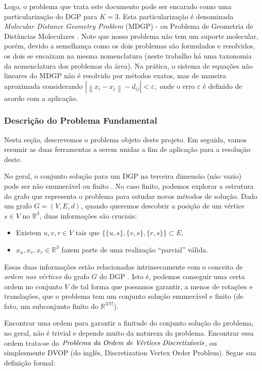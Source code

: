 \documentclass[11pt]{article}
\begin{document}
{Logo, o problema que trata este documento pode ser encarado como uma particularização do DGP para $K = 3$. Esta particularização é denominada {\emph{Molecular Distance Geometry Problem}} (MDGP) - ou Problema de Geometria de Distâncias Moleculares \cite{LavorCNMAC:14}. Note que nosso problema não tem um suporte molecular, porém, devido a semelhança como os dois problemas são formulados e resolvidos, os dois se encaixam na mesma nomenclatura \cite{Survey:12} (neste trabalho há uma taxonomia da nomenclatura dos problemas da área). Na prática, o sistema de equações não lineares do MDGP não é resolvido por métodos exatos, mas de maneira aproximada considerando $| \left\|x_{i}-x_{j}\right\| -  d_{ij} |  < \varepsilon,$ onde o  erro $\varepsilon$ é definido de acordo com a aplicação.

\subsubsection{Descrição do Problema Fundamental}
Nesta seção, descrevemos o problema objeto deste projeto. Em seguida, vamos resumir as duas ferramentas a serem unidas a fim de aplicação para a resolução deste.

No geral, o conjunto solução para um DGP na terceira dimensão (não vazio) pode ser não enumerável ou finito \cite{carlileBook31Coloquio}. No caso finito, podemos explorar a estrutura do grafo que representa o problema para estudar novos métodos de solução. Dado um grafo $G = (V, E, d)$, quando queremos descobrir a posição de um vértice $s \in V$ no $\mathbb{R}^3$, duas informações são cruciais:
\begin{itemize}
	\item Existem $u, v, r \in V$ tais que $\{\{u,s\},\{v,s\},\{r,s\}\} \subset E$,
	\item $x_u, x_v, x_r \in \mathbb{R}^3$ fazem parte de uma realização ``parcial'' válida.
\end{itemize}

Essas duas informações estão relacionadas intrinsecamente com o conceito de \textit{ordem nos vértices} do grafo $G$ do DGP \cite{carlile:DDGP}. Isto é, podemos conseguir uma certa ordem no conjunto $V$ de tal forma que possamos garantir, a menos de rotações e translações, que o problema tem um conjunto solução enumerável e finito (de fato, um subconjunto finito do $\mathbb{R}^{3|V|}$). \cite{carlileBook31Coloquio}

Encontrar uma ordem para garantir a finitude do conjunto solução do problema, no geral, não é trivial e depende muito da natureza do problema. Encontrar essa ordem trata-se do $\emph{Problema da Ordem de Vértices Discretizáveis}$, ou simplesmente DVOP (do inglês, Discretization Vertex Order Problem). Segue sua definição formal:

}
\end{document}

